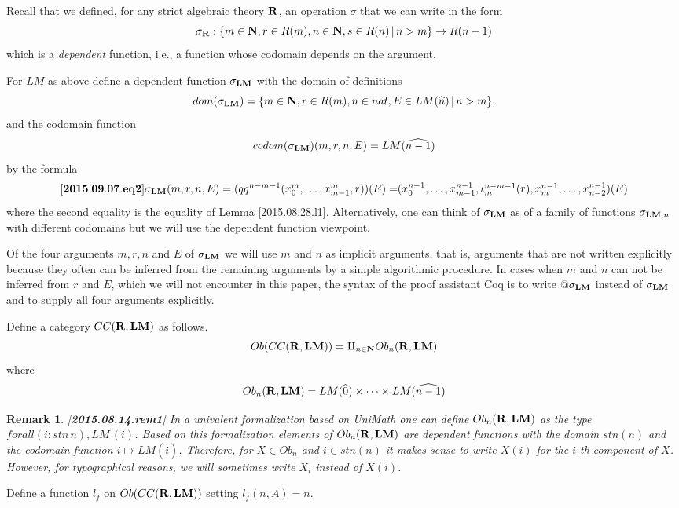 \documentclass[11pt]{article}
\newenvironment{eq}{\begin{equation}}{\end{equation}}
\newtheorem{remark}[proposition]{Remark}
\newcommand{\llabel}[1]{\label{#1}[{\bf #1}]}
\newcommand{\sr}{\rightarrow}
\newcommand{\nn}{{\bf N\rm}}
\newcommand{\nat}{\nn}
\newcommand{\rr}{{\bf R}}
\newcommand{\lm}{{\bf LM}}
\newcommand{\wh}{\widehat}
\begin{document}
Recall that we defined, for any strict algebraic theory $\rr$, an operation $\sigma$ that we can write in the form
%
$$\sigma_{\rr}:\{m\in\nat,r\in R(m),n\in\nat,s\in R(n)\,|\,n>m\}\sr R(n-1)$$
%
which is a {\em dependent} function, i.e., a function whose codomain depends on the argument. 

For $LM$ as above define a dependent function $\sigma_{\lm}$ with the domain of definitions 
%
$$dom(\sigma_{\lm})=\{m\in\nat,r\in R(m),n\in nat, E\in LM(\wh{n})\,|\,n>m\},$$
%
and the codomain function
%
$$codom(\sigma_{\lm})(m,r,n,E)=LM(\wh{n-1})$$
%
by the formula
%
\begin{eq}\llabel{2015.09.07.eq2}
\sigma_{\lm}(m,r,n,E)=(qq^{n-m-1}(x_0^m,\dots,x_{m-1}^m,r))(E)=$$
$$(x_0^{n-1},\dots,x_{m-1}^{n-1},\iota_m^{n-m-1}(r),x_m^{n-1},\dots, x_{n-2}^{n-1})(E)
\end{eq}
%
where the second equality is the equality of Lemma \ref{2015.08.28.l1}. Alternatively, one can think of $\sigma_{\lm}$ as of a family of functions $\sigma_{\lm,n}$ with different codomains but we will use the dependent function viewpoint.

Of the four arguments $m,r,n$ and $E$ of $\sigma_{\lm}$ we will use $m$ and $n$ as implicit arguments, that is, arguments that are not written explicitly because they often can be inferred from the remaining arguments by a simple algorithmic procedure. In cases when $m$ and $n$ can not be inferred from $r$ and $E$, which we will not encounter in this paper, the syntax of the proof assistant Coq is to write $@\sigma_{\lm}$ instead of $\sigma_{\lm}$ and to supply all four arguments explicitly. 

Define a category $CC(\rr,\lm)$ as follows.
%
$$Ob(CC(\rr,\lm))=\amalg_{n\in\nat} Ob_n(\rr,\lm)$$
%
where 
%
$$Ob_n(\rr,\lm)=LM(\wh{0})\times\dots\times LM(\wh{n-1})$$
%
\begin{remark}\rm
\llabel{2015.08.14.rem1}
In a univalent formalization based on UniMath one can define $Ob_n(\rr,\lm)$ as the type $forall(i:stn\,n),LM\, (i)$. Based on this formalization elements of $Ob_n(\rr,\lm)$ are dependent functions with the domain $stn(n)$ and the codomain function $i\mapsto LM(\wh{i})$. Therefore, for $X\in Ob_n$ and $i\in stn(n)$ it makes sense to write $X(i)$ for the $i$-th component of $X$. However, for typographical reasons, we will sometimes write $X_i$ instead of $X(i)$. 
\end{remark}
%

Define a function $l_f$ on $Ob(CC(\rr,\lm))$ setting $l_f(n,A)=n$.
\end{document}
